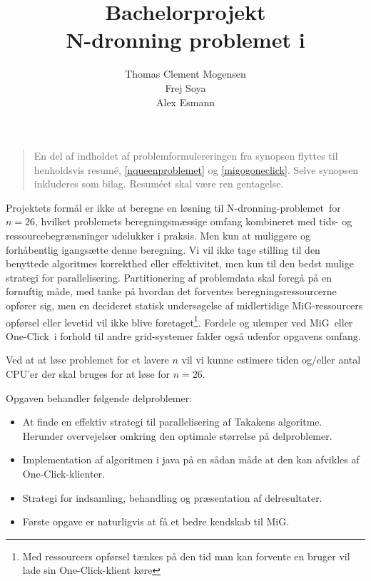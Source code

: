 \documentclass[pdf,draft,a4paper,11pt]{article}
\title{Bachelorprojekt\\N-dronning problemet i \mig}
\author{Thomas Clement Mogensen \\ Frej Soya \\ Alex Esmann }
\newcommand{\mig}{MiG}
\newcommand{\oc}{One-Click}
\newcommand{\nq}{N-dronning-problemet}
\renewcommand{\thepage}{\roman{page}}
\begin{document}
\maketitle
\tableofcontents
\newpage

\renewcommand{\thepage}{\arabic{page}}
\pagestyle{fancy}                              %
\fancyhead[R]{\thepage\ af \pageref{LastPage}} %
\fancyhead[L]{\nq\ i \mig}              %
\fancyfoot[C]{}                                %
\setcounter{page}{1}

\abstract
\begin{verse}
	En del af indholdet af problemformulereringen fra synopsen flyttes til henholdsvis resumé, \ref{nqueenproblemet} og \ref{migogoneclick}. Selve synopsen inkluderes som bilag. Resuméet skal være ren gentagelse.
\end{verse}
Projektets formål er ikke at beregne en løsning til \nq\ for $n=26$, hvilket problemets beregningsmæssige omfang kombineret med tids- og ressourcebegrænsninger udelukker i praksis. Men kun at muliggøre og forhåbentlig igangsætte denne beregning.
Vi vil ikke tage stilling til den benyttede algoritmes korrekthed eller effektivitet, men kun til den bedst mulige strategi for parallelisering. Partitionering af problemdata skal foregå på en fornuftig måde, med tanke på hvordan det forventes beregningsressourcerne opfører sig, men en decideret statisk undersøgelse af midlertidige \mig-ressourcers opførsel eller levetid vil ikke blive foretaget\footnote{Med ressourcers opførsel tænkes på den tid man kan forvente en bruger vil lade sin \oc-klient køre}. Fordele og ulemper ved \mig\ eller \oc\ i forhold til andre grid-systemer falder også udenfor opgavens omfang.

Ved at at løse problemet for et lavere $n$ vil vi kunne estimere tiden og/eller antal CPU'er der skal bruges for at løse for $n=26$.

 Opgaven behandler følgende delproblemer:
\begin{itemize}
\item At finde en effektiv strategi til parallelisering af Takakens algoritme. Herunder overvejelser omkring den optimale størrelse på delproblemer.
\item Implementation af algoritmen i java på en sådan måde at den kan afvikles af \oc-klienter.
\item Strategi for indsamling, behandling og præsentation af delresultater.
\item Første opgave er naturligvis at få et bedre kendskab til \mig.
\end{itemize}
\end{document}
